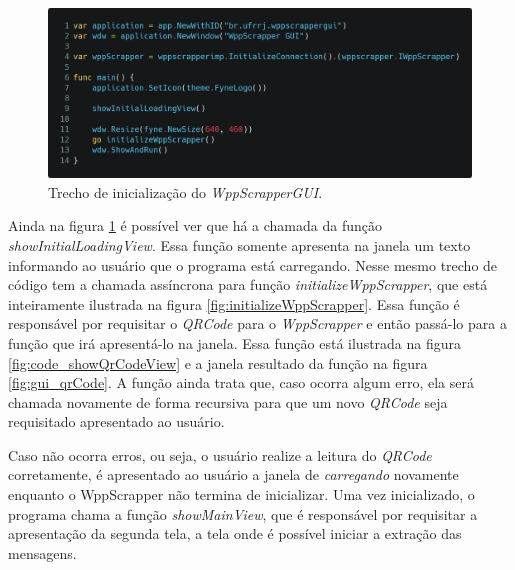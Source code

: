 \begin{figure}[h!]
    \includegraphics[width=\textwidth]{img/code_main_func.png}
    \caption{Trecho de inicialização do \textit{WppScrapperGUI}.}
    \centering
    \label{fig:Code_Main_Func}
\end{figure}

Ainda na figura \ref{fig:Code_Main_Func} é possível ver que há a chamada da função \textit{showInitialLoadingView}. Essa função somente apresenta na janela um texto informando ao usuário que o programa está carregando. Nesse mesmo trecho de código tem a chamada assíncrona para função \textit{initializeWppScrapper}, que está inteiramente ilustrada na figura \ref{fig:initializeWppScrapper}. Essa função é responsável por requisitar o \textit{QRCode} para o \textit{WppScrapper} e então passá-lo para a função que irá apresentá-lo na janela. Essa função está ilustrada na figura \ref{fig:code_showQrCodeView} e a janela resultado da função na figura \ref{fig:gui_qrCode}. A função ainda trata que, caso ocorra algum erro, ela será chamada novamente de forma recursiva para que um novo \textit{QRCode} seja requisitado apresentado ao usuário. 

Caso não ocorra erros, ou seja, o usuário realize a leitura do \textit{QRCode} corretamente, é apresentado ao usuário a janela de \textit{carregando} novamente enquanto o WppScrapper não termina de inicializar. Uma vez inicializado, o programa chama a função \textit{showMainView}, que é responsável por requisitar a apresentação da segunda tela, a tela onde é possível iniciar a extração das mensagens.

